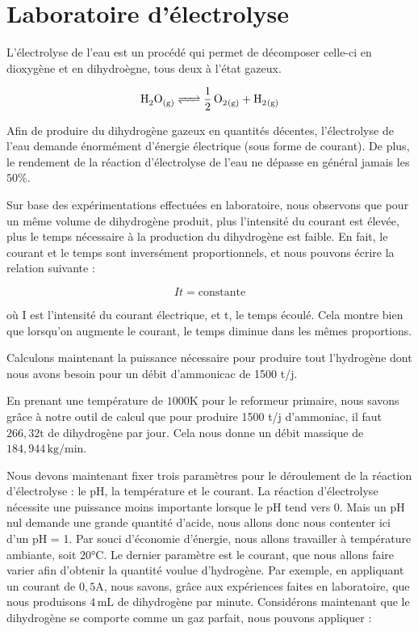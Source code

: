 \documentclass[a4paper, oneside, 12pt]{article}
\begin{document}
\section{Laboratoire d’électrolyse}

L'électrolyse de l'eau est un procédé qui permet de décomposer 
celle-ci en dioxygène et en dihydroègne, tous deux à l'état gazeux.

\begin{equation*}
	\ce{H2O_{(g)} <=> \frac{1}{2} \, O2_{(g)} + H2_{(g)}} 
\end{equation*}

Afin de produire du dihydrogène gazeux en quantités décentes, l'électrolyse de l'eau 
demande énormément d'énergie électrique (sous forme de courant). De plus, le rendement
de la réaction d'électrolyse de l'eau ne dépasse en général jamais les $50\%$.

Sur base des expérimentations effectuées en laboratoire, nous observons que pour un même volume de dihydrogène produit, 
plus l’intensité du courant est élevée, plus le temps nécessaire à la production
du dihydrogène est faible. En fait, le courant et le temps sont inversément proportionnels, 
et nous pouvons écrire la relation suivante :

\begin{equation*}
	It = \text{constante}
\end{equation*}

où I est l'intensité du courant électrique, et t, le temps écoulé. 
Cela montre bien que lorsqu'on augmente le courant, le temps diminue dans les mêmes proportions.

Calculons maintenant la puissance nécessaire pour produire tout l'hydrogène 
dont nous avons besoin pour un débit d'ammonicac de 1500 t/j.

En prenant une température de $1000 \si{\kelvin}$ pour le reformeur primaire, 
nous savons grâce à notre outil de calcul que pour produire 1500 t/j d'ammoniac, il faut $266,32 \si{\tonne}$ de dihydrogène 
par jour. Cela nous donne un débit massique de $184,944 \, \si{\kilo\gram/\minute}$.

Nous devons maintenant fixer trois paramètres pour le déroulement de la réaction d'électrolyse : le pH, la température et le courant.
La réaction d'électrolyse nécessite une puissance moins importante lorsque le pH tend vers 0. Mais un pH nul demande une grande quantité d'acide, nous allons donc nous contenter ici d'un pH = 1.
Par souci d'économie d'énergie, nous allons travailler à température ambiante, soit $20\si{\celsius}$.
Le dernier paramètre est le courant, que nous allons faire varier afin d'obtenir la quantité voulue d'hydrogène.
Par exemple, en appliquant un courant de $0,5 \si{\ampere}$, nous savons, grâce aux expériences faites en laboratoire, 
que nous produisons $4 \, \si{\milli\liter}$ de dihydrogène par minute. 
Considérons maintenant que le dihydrogène se comporte comme un gaz parfait, nous pouvons appliquer :
\end{document}

